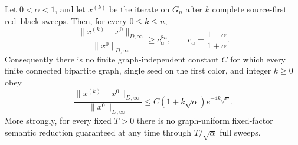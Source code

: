 \begin{theorem}
\label{thm:global-semantic-sor-stop}
Let $0<\alpha<1$, and let $x^{(k)}$ be the iterate on $G_n$ after $k$ complete
source-first red--black sweeps.  Then, for every $0\leq k\leq n$,
\begin{equation}
 \frac{\|x^{(k)}-x^0\|_{D,\infty}}
      {\|x^0\|_{D,\infty}}
 \geq c_\alpha^{8n},
 \qquad
 c_\alpha=\frac{1-\alpha}{1+\alpha}.
 \label{eq:global-semantic-sor-stop-lower}
\end{equation}
Consequently there is no finite graph-independent constant $C$ for which
every finite connected bipartite graph, single seed on the first color, and
integer $k\geq0$ obey
\begin{equation}
 \frac{\|x^{(k)}-x^0\|_{D,\infty}}
      {\|x^0\|_{D,\infty}}
 \leq C(1+k\sqrt\alpha)e^{-4k\sqrt\alpha}.
 \label{eq:global-semantic-sor-envelope-refuted}
\end{equation}
More strongly, for every fixed $T>0$ there is no graph-uniform fixed-factor
semantic reduction guaranteed at any time through $T/\sqrt\alpha$ full
sweeps.
\end{theorem}

